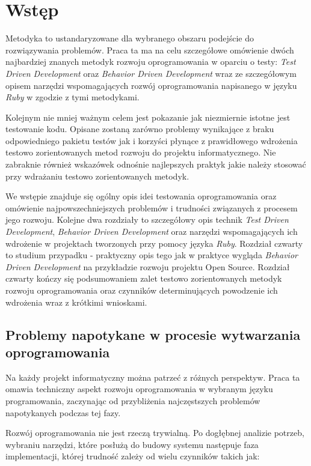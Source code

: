 
\nocite{ruby_way}
\nocite{rails_guides}
\nocite{polish_ruby_forum}

\chapter[Wstęp]{Wstęp}
  Metodyka to ustandaryzowane dla wybranego obszaru podejście do rozwiązywania problemów. Praca ta ma na celu szczegółowe omówienie dwóch najbardziej znanych metodyk rozwoju oprogramowania w oparciu o testy: \emph{Test Driven Development} oraz \emph{Behavior Driven Development} wraz ze szczegółowym opisem narzędzi wspomagających rozwój oprogramowania napisanego w języku \emph{Ruby} w zgodzie z tymi metodykami.
  
  Kolejnym nie mniej ważnym celem jest pokazanie jak niezmiernie istotne jest testowanie kodu. Opisane zostaną zarówno problemy wynikające z braku odpowiedniego pakietu testów jak i korzyści płynące z prawidłowego wdrożenia testowo zorientowanych metod rozwoju do projektu informatycznego. Nie zabraknie również wskazówek odnośnie najlepszych praktyk jakie należy stosować przy wdrażaniu testowo zorientowanych metodyk.
  
  We wstępie znajduje się ogólny opis idei testowania oprogramowania oraz omówienie najpowszechniejszych problemów i trudności związanych z procesem jego rozwoju. Kolejne dwa rozdziały to szczegółowy opis technik \emph{Test Driven Development}, \emph{Behavior Driven Development} oraz narzędzi wspomagających ich wdrożenie w projektach tworzonych przy pomocy języka \emph{Ruby}. Rozdział czwarty to studium przypadku - praktyczny opis tego jak w praktyce wygląda \emph{Behavior Driven Development} na przykładzie rozwoju projektu Open Source. Rozdział czwarty kończy się podsumowaniem zalet testowo zorientowanych metodyk rozwoju oprogramowania oraz czynników determinujących powodzenie ich wdrożenia wraz z krótkimi wnioskami.
  
	\section{Problemy napotykane w procesie wytwarzania oprogramowania}
	  Na każdy projekt informatyczny można patrzeć z różnych perspektyw. Praca ta omawia techniczny aspekt rozwoju oprogramowania w wybranym języku programowania, zaczynając od przybliżenia najczęstszych problemów napotykanych podczas tej fazy.
	  
	  Rozwój oprogramowania nie jest rzeczą trywialną. Po dogłębnej analizie potrzeb, wybraniu narzędzi, które posłużą do budowy systemu następuje faza implementacji, której trudność zależy od wielu czynników takich jak:
	  
